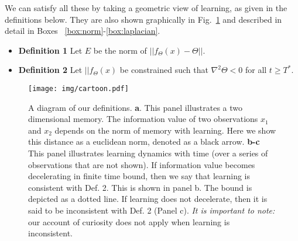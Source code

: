 We can satisfy all these by taking a geometric view of learning, as given in the definitions below. They are also shown graphically in Fig.~\ref{fig:cartoon} and described in detail in Boxes ~\ref{box:norm}-\ref{box:laplacian}.

\begin{itemize}
	\item[] \textbf{Definition 1} Let $E$ be the norm of $|| f_{\Theta}(x) - \Theta ||$.	
	\item[] \textbf{Definition 2} Let $|| f_{\Theta}(x)$ be constrained such that $\nabla^2 \Theta < 0$ for all $ t \ge T^*$. 	
\end{itemize}

\begin{figure}
	\begin{fullwidth}
	\texttt{[image: img/cartoon.pdf]} 
	\caption{A diagram of our definitions. 
	\textbf{a}. This panel illustrates a two dimensional memory. The information value of two observations $x_1$ and $x_2$ depends on the norm of memory with learning. Here we show this distance as a euclidean norm, denoted as a black arrow.
	\textbf{b-c} This panel illustrates learning dynamics with time (over a series of observations that are not shown). If information value becomes decelerating in finite time bound, then we say that learning is consistent with Def. 2. This is shown in panel b. The bound is depicted as a dotted line. If learning does not decelerate, then it is said to be inconsistent with Def. 2 (Panel c). \textit{It is important to note:} our account of curiosity does not apply when learning is inconsistent.
  	}
	\label{fig:cartoon} 
	\end{fullwidth}
\end{figure}

